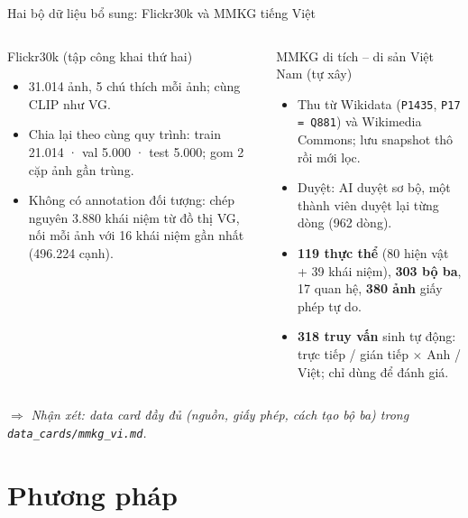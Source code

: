 \documentclass[10pt, aspectratio=169]{beamer}
\newcommand{\nhanxet}[1]{\par\smallskip$\Rightarrow$ \textit{Nhận xét: #1}}
\newcommand{\code}[1]{\texttt{#1}}
\begin{document}
\begin{frame}{Hai bộ dữ liệu bổ sung: Flickr30k và MMKG tiếng Việt}
  \begin{columns}[T]
      \begin{block}{Flickr30k (tập công khai thứ hai)}
        \begin{itemize}
          \item 31.014 ảnh, 5 chú thích mỗi ảnh; cùng CLIP như VG.
          \item Chia lại theo cùng quy trình: train 21.014 · val 5.000 · test 5.000; gom 2 cặp ảnh gần trùng.
          \item Không có annotation đối tượng: chép nguyên 3.880 khái niệm từ đồ thị VG, nối mỗi ảnh với 16 khái niệm gần nhất (496.224 cạnh).
        \end{itemize}
      \end{block}
      \begin{block}{MMKG di tích -- di sản Việt Nam (tự xây)}
        \begin{itemize}
          \item Thu từ Wikidata (\code{P1435}, \code{P17 = Q881}) và Wikimedia Commons; lưu snapshot thô rồi mới lọc.
          \item Duyệt: AI duyệt sơ bộ, một thành viên duyệt lại từng dòng (962 dòng).
          \item \textbf{119 thực thể} (80 hiện vật + 39 khái niệm), \textbf{303 bộ ba}, 17 quan hệ, \textbf{380 ảnh} giấy phép tự do.
          \item \textbf{318 truy vấn} sinh tự động: trực tiếp / gián tiếp $\times$ Anh / Việt; chỉ dùng để đánh giá.
        \end{itemize}
      \end{block}
  \end{columns}
  \nhanxet{data card đầy đủ (nguồn, giấy phép, cách tạo bộ ba) trong \code{data\_cards/mmkg\_vi.md}.}
\end{frame}

\section{Phương pháp}
\end{document}
